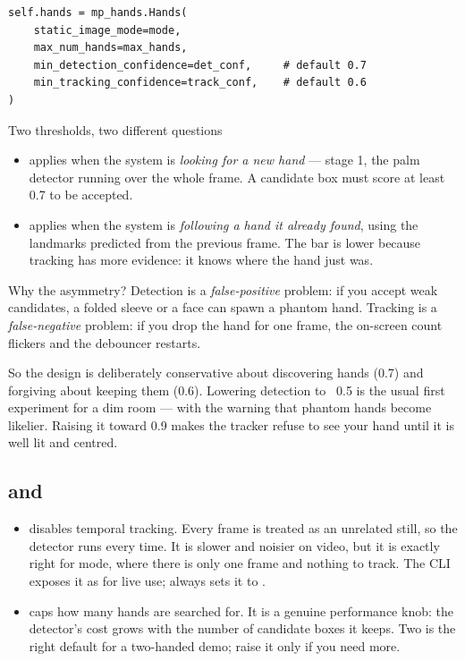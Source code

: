 \begin{codecard}
\begin{lstlisting}
self.hands = mp_hands.Hands(
    static_image_mode=mode,
    max_num_hands=max_hands,
    min_detection_confidence=det_conf,     # default 0.7
    min_tracking_confidence=track_conf,    # default 0.6
)
\end{lstlisting}
\end{codecard}

\begin{mlconcept}{Two thresholds, two different questions}
\begin{itemize}
  \item {} applies when the system is \emph{looking for a new
        hand} --- stage 1, the palm detector running over the whole frame. A candidate box must score
        at least 0.7 to be accepted.
  \item {} applies when the system is \emph{following a hand it
        already found}, using the landmarks predicted from the previous frame. The bar is lower
        because tracking has more evidence: it knows where the hand just was.
\end{itemize}

Why the asymmetry? Detection is a \emph{false-positive} problem: if you accept weak candidates, a
folded sleeve or a face can spawn a phantom hand. Tracking is a \emph{false-negative} problem: if you
drop the hand for one frame, the on-screen count flickers and the debouncer restarts.

So the design is deliberately conservative about discovering hands (0.7) and forgiving about keeping
them (0.6). Lowering detection to ~0.5 is the usual first experiment for a dim room --- with the
warning that phantom hands become likelier. Raising it toward 0.9 makes the tracker refuse to see
your hand until it is well lit and centred.
\end{mlconcept}

\subsection{ and }

\begin{itemize}
  \item {} disables temporal tracking. Every frame is treated as an
        unrelated still, so the detector runs every time. It is slower and noisier on video, but it
        is exactly right for  mode, where there is only one frame and nothing to
        track. The CLI exposes it as  for live use;  always sets
        it to .
  \item {} caps how many hands are searched for. It is a genuine performance
        knob: the detector's cost grows with the number of candidate boxes it keeps. Two is the
        right default for a two-handed demo; raise it only if you need more.
\end{itemize}

